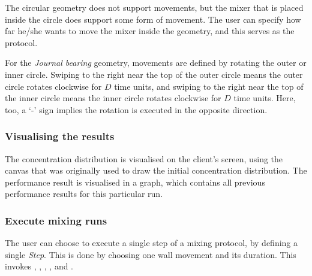 The circular geometry does not support movements, but the mixer that is placed inside the circle does support some form of movement. The user can specify how far he/she wants to move the mixer inside the geometry, and this serves as the protocol.

For the \emph{Journal bearing} geometry, movements are defined by rotating the outer or inner circle. Swiping to the right near the top of the outer circle means the outer circle rotates clockwise for $D$ time units, and swiping to the right near the top of the inner circle means the inner circle rotates clockwise for $D$ time units. Here, too, a `-' sign implies the rotation is executed in the opposite direction.





\subsubsection{Visualising the results}
The concentration distribution is visualised on the client's screen, using the canvas that was originally used to draw the initial concentration distribution. The performance result is visualised in a graph, which contains all previous performance results for this particular run.



\subsubsection{Execute mixing runs}
The user can choose to execute a single step of a mixing protocol, by defining a single \emph{Step}. This is done by choosing one wall movement and its duration. This invokes , , , ,  and .

